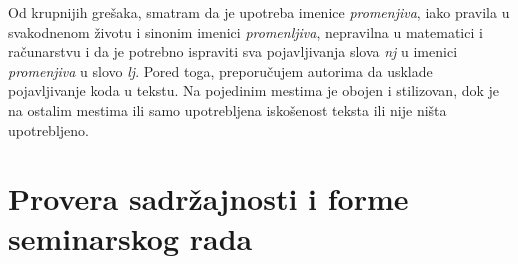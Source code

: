 \documentclass[a4paper]{report}
\begin{document}
Od krupnijih grešaka, smatram da je upotreba imenice \textit{promenjiva}, iako pravila u svakodnenom životu i sinonim imenici \textit{promenljiva}, nepravilna u matematici i računarstvu i da je potrebno ispraviti sva pojavljivanja slova \textit{nj} u imenici \textit{promenjiva} u slovo \textit{lj}.
Pored toga, preporučujem autorima da usklade pojavljivanje koda u tekstu. Na pojedinim mestima je obojen i stilizovan, dok je na ostalim mestima ili samo upotrebljena iskošenost teksta ili nije ništa upotrebljeno. 

\section{Provera sadržajnosti i forme seminarskog rada}
\end{document}
